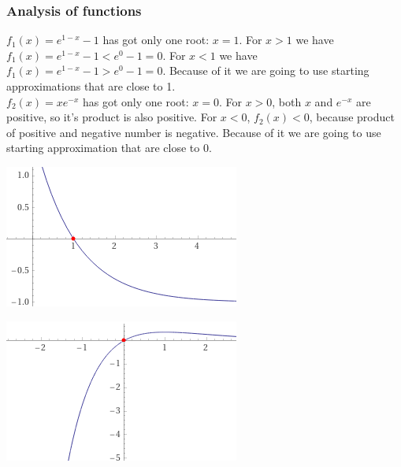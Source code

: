 \documentclass[11pt]{article}
\begin{document}
\subsubsection{Analysis of functions}
$f_1(x) = e^{1-x} - 1$ has got only one root: $x=1$. For $x>1$ we have $f_1(x) = e^{1-x} - 1 < e^0 - 1 = 0$. For $x < 1$ we have $f_1(x) = e^{1-x} - 1 > e^0 - 1 = 0$. Because of it we are going to use starting approximations that are close to 1.\\
$f_2(x) = xe^{-x}$ has got only one root: $x=0$. For $x > 0$, both $x$ and $e^{-x}$ are positive, so it's product is also positive. For $x < 0$, $f_2(x) < 0$, because product of positive and negative number is negative. Because of it we are going to use starting approximation that are close to 0.\\
\begin{minipage}{1\linewidth}
    \begin{minipage}{0.5\linewidth}
        \includegraphics[scale=0.7]{ex6_plot_wolfram_fx}
    \end{minipage}
    \hfill
    \begin{minipage}{0.5\linewidth}
        \includegraphics[scale=0.7]{ex6_plot_wolfram_gx}
    \end{minipage}
\end{minipage}
\end{document}
